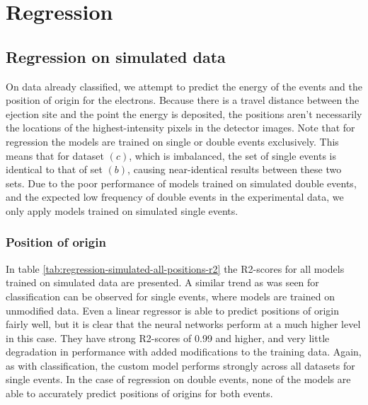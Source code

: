



 
\section{Regression}
\subsection{Regression on simulated data}
On data already classified, we attempt to predict the energy of the events and the 
position of origin for the electrons. Because there is a travel distance between the 
ejection site and the point the energy is deposited, the positions aren't necessarily
the locations of the highest-intensity pixels in the detector images.
Note that for regression the models are trained on single or double events exclusively.
This means that for dataset $(c)$, which is imbalanced, the set of single events is
identical to that of set $(b)$, causing near-identical results between these two sets.
Due to the poor performance of models trained on simulated double events, and the
expected low frequency of double events in the experimental data, we only apply models
trained on simulated single events.
\subsubsection{Position of origin}
In table \ref{tab:regression-simulated-all-positions-r2} the R2-scores for all models
trained on simulated data are presented. A similar trend as was seen for classification
can be observed for single events, where models are trained on unmodified data. Even
a linear regressor is able to predict positions of origin fairly well, but it is clear
that the neural networks perform at a much higher level in this case. They have strong
R2-scores of 0.99 and higher, and very little degradation in performance with added 
modifications to the training data. Again, as with classification, the custom model
performs strongly across all datasets for single events.
In the case of regression on double events, none of the models are able to accurately
predict positions of origins for both events.

